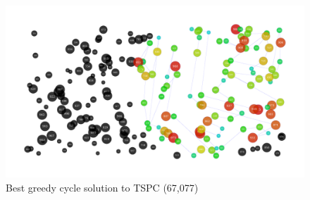 \documentclass[14pt]{article}
\begin{document}
\begin{figure}[H]
	\begin{adjustwidth}{-3em}{0}
		\includegraphics{results/best_greedy-cycle_TSPC.pdf}
	\end{adjustwidth}
	\vspace{-15mm}
	\caption{Best greedy cycle solution to TSPC (67,077)}
\end{figure}
\end{document}
